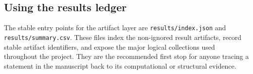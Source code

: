 \documentclass[11pt]{article}
\numberwithin{equation}{section}
\newcommand{\code}[1]{\nolinkurl{#1}}
\theoremstyle{definition}
\theoremstyle{remark}
\begin{document}
\subsection{Using the results ledger}

The stable entry points for the artifact layer are \code{results/index.json} and \code{results/summary.csv}. These files index the non-ignored result artifacts, record stable artifact identifiers, and expose the major logical collections used throughout the project. They are the recommended first stop for anyone tracing a statement in the manuscript back to its computational or structural evidence.
 


\end{document}
